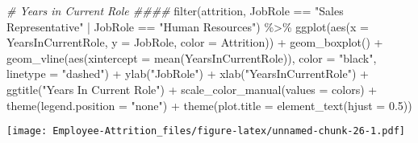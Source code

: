 \documentclass[
]{article}
\newenvironment{Shaded}{\begin{snugshade}}{\end{snugshade}}
\newcommand{\AttributeTok}[1]{\textcolor[rgb]{0.77,0.63,0.00}{#1}}
\newcommand{\CommentTok}[1]{\textcolor[rgb]{0.56,0.35,0.01}{\textit{#1}}}
\newcommand{\FloatTok}[1]{\textcolor[rgb]{0.00,0.00,0.81}{#1}}
\newcommand{\FunctionTok}[1]{\textcolor[rgb]{0.00,0.00,0.00}{#1}}
\newcommand{\NormalTok}[1]{#1}
\newcommand{\SpecialCharTok}[1]{\textcolor[rgb]{0.00,0.00,0.00}{#1}}
\newcommand{\StringTok}[1]{\textcolor[rgb]{0.31,0.60,0.02}{#1}}
\begin{document}
\begin{Shaded}
\begin{Highlighting}[]
\CommentTok{\# Years in Current Role \#\#\#\#}
\FunctionTok{filter}\NormalTok{(attrition, JobRole }\SpecialCharTok{==} \StringTok{"Sales Representative"} \SpecialCharTok{|}\NormalTok{ JobRole }\SpecialCharTok{==} \StringTok{"Human Resources"}\NormalTok{) }\SpecialCharTok{\%\textgreater{}\%}
  \FunctionTok{ggplot}\NormalTok{(}\FunctionTok{aes}\NormalTok{(}\AttributeTok{x =}\NormalTok{ YearsInCurrentRole, }\AttributeTok{y =}\NormalTok{ JobRole, }\AttributeTok{color =}\NormalTok{ Attrition)) }\SpecialCharTok{+}
  \FunctionTok{geom\_boxplot}\NormalTok{() }\SpecialCharTok{+}
  \FunctionTok{geom\_vline}\NormalTok{(}\FunctionTok{aes}\NormalTok{(}\AttributeTok{xintercept =} \FunctionTok{mean}\NormalTok{(YearsInCurrentRole)), }\AttributeTok{color =} \StringTok{"black"}\NormalTok{, }\AttributeTok{linetype =} \StringTok{"dashed"}\NormalTok{) }\SpecialCharTok{+}
  \FunctionTok{ylab}\NormalTok{(}\StringTok{"JobRole"}\NormalTok{) }\SpecialCharTok{+}
  \FunctionTok{xlab}\NormalTok{(}\StringTok{"YearsInCurrentRole"}\NormalTok{) }\SpecialCharTok{+}
  \FunctionTok{ggtitle}\NormalTok{(}\StringTok{"Years In Current Role"}\NormalTok{) }\SpecialCharTok{+}
  \FunctionTok{scale\_color\_manual}\NormalTok{(}\AttributeTok{values =}\NormalTok{ colors) }\SpecialCharTok{+}
  \FunctionTok{theme}\NormalTok{(}\AttributeTok{legend.position =} \StringTok{"none"}\NormalTok{) }\SpecialCharTok{+}
  \FunctionTok{theme}\NormalTok{(}\AttributeTok{plot.title =} \FunctionTok{element\_text}\NormalTok{(}\AttributeTok{hjust =} \FloatTok{0.5}\NormalTok{)) }
\end{Highlighting}
\end{Shaded}

\texttt{[image: Employee-Attrition\_files/figure-latex/unnamed-chunk-26-1.pdf]}
\end{document}
